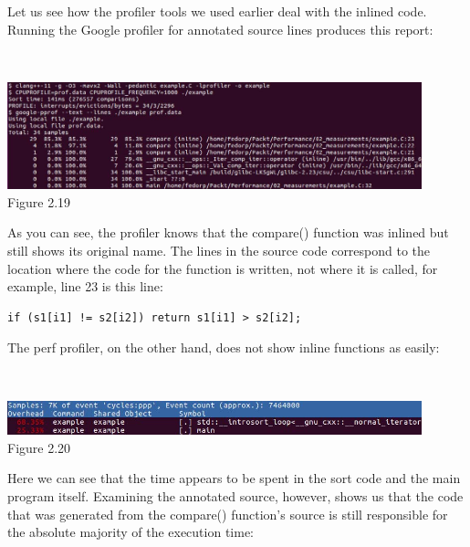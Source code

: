 Let us see how the profiler tools we used earlier deal with the inlined code. Running the Google profiler for annotated source lines produces this report:

\hspace*{\fill} \\ %
\begin{center}
\includegraphics[width=0.9\textwidth]{content/1/chapter2/images/19.jpg}\\
Figure 2.19
\end{center}

As you can see, the profiler knows that the compare() function was inlined but still shows its original name. The lines in the source code correspond to the location where the code for the function is written, not where it is called, for example, line 23 is this line:

\begin{lstlisting}[style=styleCXX]
if (s1[i1] != s2[i2]) return s1[i1] > s2[i2];
\end{lstlisting}

The perf profiler, on the other hand, does not show inline functions as easily:

\hspace*{\fill} \\ %
\begin{center}
\includegraphics[width=0.9\textwidth]{content/1/chapter2/images/20.jpg}\\
Figure 2.20
\end{center}

Here we can see that the time appears to be spent in the sort code and the main program itself. Examining the annotated source, however, shows us that the code that was generated from the compare() function's source is still responsible for the absolute majority of the execution time:

